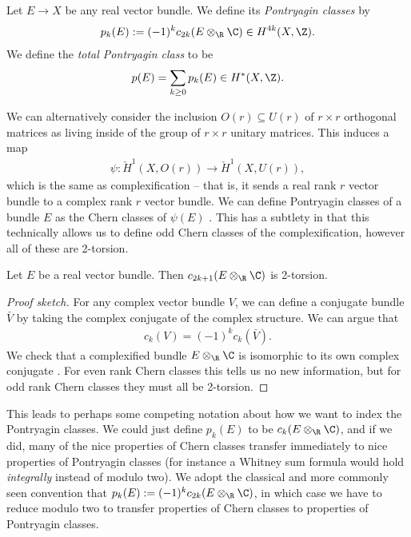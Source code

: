 \documentclass[11pt]{book}
\begin{document}
\begin{definition}\label{def:pontryagin-class} Let $E \to X$ be any real vector bundle. We define its \emph{Pontryagin classes} by
\begin{align*}
    p_k(E) := (-1)^k c_{2k}(E \otimes_\R \C) \in H^{4k}(X,\Z).
\end{align*}
We define the \emph{total Pontryagin class} to be
\begin{align*}
    p(E) = \sum_{k\ge0} p_k(E) \in H^{\ast}(X,\Z).
\end{align*}
\end{definition}

\begin{remark} We can alternatively consider the inclusion $O(r) \subseteq U(r)$ of $r \times r$ orthogonal matrices as living inside of the group of $r \times r$ unitary matrices. This induces a map
\begin{align*}
    \psi \colon \check{H}^1(X,O(r)) \to \check{H}^1(X,U(r)),
\end{align*}
which is the same as complexification -- that is, it sends a real rank $r$ vector bundle to a complex rank $r$ vector bundle. We can define Pontryagin classes of a bundle $E$ as the Chern classes of $\psi(E)$ \cite[4.5]{Hirzebruch}. This has a subtlety in that this technically allows us to define odd Chern classes of the complexification, however all of these are 2-torsion.
\end{remark}

\begin{proposition} Let $E$ be a real vector bundle. Then $c_{2k+1}(E \otimes_\R \C)$ is 2-torsion.
\end{proposition}
\begin{proof}[Proof sketch]
For any complex vector bundle $V$, we can define a conjugate bundle $\bar{V}$ by taking the complex conjugate of the complex structure. We can argue that
\begin{align*}
    c_k(V) = (-1)^k c_k(\bar{V}).
\end{align*}
We check that a complexified bundle $E \otimes_\R \C$ is isomorphic to its own complex conjugate \cite[15.1]{MilnorStasheff}. For even rank Chern classes this tells us no new information, but for odd rank Chern classes they must all be 2-torsion.
\end{proof}

\begin{remark} This leads to perhaps some competing notation about how we want to index the Pontryagin classes. We could just define $p_k(E)$ to be $c_k(E \otimes_\R\C)$, and if we did, many of the nice properties of Chern classes transfer immediately to nice properties of Pontryagin classes (for instance a Whitney sum formula would hold \emph{integrally} instead of modulo two). We adopt the classical and more commonly seen convention that $p_k(E) := (-1)^k c_{2k}(E \otimes_\R \C)$, in which case we have to reduce modulo two to transfer properties of Chern classes to properties of Pontryagin classes.  
\end{remark}
\end{document}

